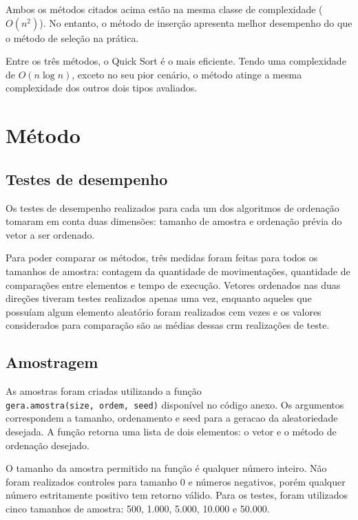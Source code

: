 \documentclass[
]{article}
\begin{document}
Ambos os métodos citados acima estão na mesma classe de complexidade
(\(O(n^2)\)). No entanto, o método de inserção apresenta melhor
desempenho do que o método de seleção na prática.

Entre os três métodos, o Quick Sort é o mais eficiente. Tendo uma
complexidade de \(O(n \log n)\), exceto no seu pior cenário, o método
atinge a mesma complexidade dos outros dois tipos avaliados.

\hypertarget{muxe9todo}{%
\section{Método}\label{muxe9todo}}

\hypertarget{testes-de-desempenho}{%
\subsection{Testes de desempenho}\label{testes-de-desempenho}}

Os testes de desempenho realizados para cada um dos algoritmos de
ordenação tomaram em conta duas dimensões: tamanho de amostra e
ordenação prévia do vetor a ser ordenado.

Para poder comparar os métodos, três medidas foram feitas para todos os
tamanhos de amostra: contagem da quantidade de movimentações, quantidade
de comparações entre elementos e tempo de execução. Vetores ordenados
nas duas direções tiveram testes realizados apenas uma vez, enquanto
aqueles que possuíam algum elemento aleatório foram realizados cem vezes
e os valores considerados para comparação são as médias dessas crm
realizações de teste.

\hypertarget{amostragem}{%
\subsection{Amostragem}\label{amostragem}}

As amostras foram criadas utilizando a função
\texttt{gera.amostra(size,\ ordem,\ seed)} disponível no código anexo.
Os argumentos correspondem a tamanho, ordenamento e seed para a geracao
da aleatoriedade desejada. A função retorna uma lista de dois elementos:
o vetor e o método de ordenação desejado.

O tamanho da amostra permitido na função é qualquer número inteiro. Não
foram realizados controles para tamanho 0 e números negativos, porém
qualquer número estritamente positivo tem retorno válido. Para os
testes, foram utilizados cinco tamanhos de amostra: 500, 1.000, 5.000,
10.000 e 50.000.
\end{document}
